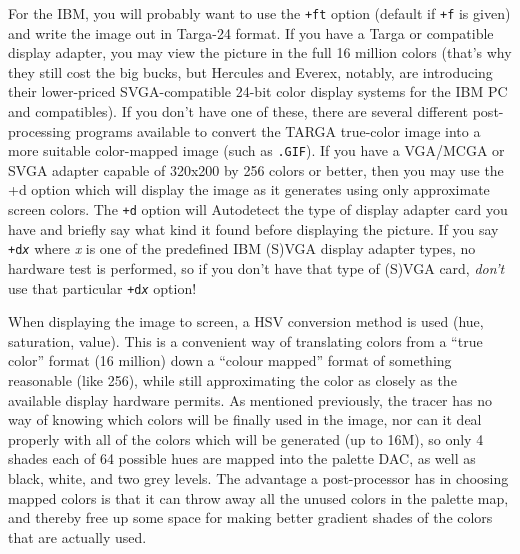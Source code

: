 For the IBM, you will probably want to use the {\tt +ft}
option (default if {\tt +f} is given) and write the image out in
Targa-24
format.  If you have a Targa or compatible display adapter, you may
view the picture in the full 16 million colors (that's why they still
cost the big bucks, but Hercules and Everex, notably, are introducing
their lower-priced SVGA-compatible 24-bit color display systems for
the IBM PC and compatibles).  If you don't have one of these, there
are several different post-processing programs available to convert
the TARGA true-color image into a more suitable color-mapped image
(such as {\tt .GIF}).  If you have a VGA/MCGA or SVGA
adapter capable
of 320x200 by 256 colors or better, then you may use the +d option
which will display the image as it generates using only approximate
screen colors.  The {\tt +d} option will Autodetect the type of
display adapter card you have and briefly say what kind it found
before displaying the picture.  If you say {\tt +d{\em x}} where
{\em x} is one of the predefined IBM (S)VGA display adapter types, no
hardware test is performed, so if you don't have that type of (S)VGA
card, {\em don't} use that particular {\tt +d{\em x}} option!

When displaying the image to screen, a HSV conversion method is used (hue,
saturation, value).  This is a convenient way of translating colors from a
``true color'' format (16 million) down a ``colour mapped'' format of something
reasonable (like 256), while still approximating the color as closely as the
available display hardware permits.  As mentioned previously, the tracer has
no way of knowing which colors will be finally used in the image, nor can it
deal properly with all of the colors which will be generated (up to 16M), so
only 4 shades each of 64 possible hues are mapped into the palette DAC, as
well as black, white, and two grey levels. The advantage a post-processor has
in choosing mapped colors is that it can throw away all the unused colors in
the palette map, and thereby free up some space for making better gradient
shades of the colors that are actually used.

